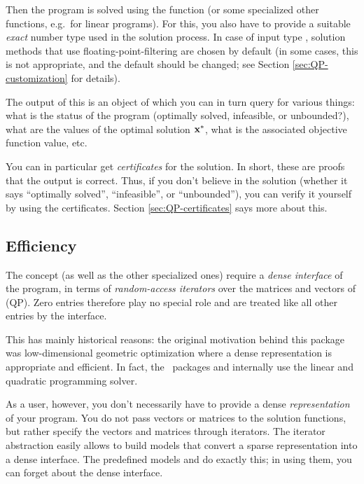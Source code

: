 Then the program is solved using the function 
(or some specialized other functions, e.g.\ for linear programs). For this,
you also have to provide a suitable \emph{exact} number type  used
in the solution process. In case of input type , solution 
methods that use floating-point-filtering are chosen by default (in some 
cases, this is not appropriate, and the default should be changed; 
see Section \ref{sec:QP-customization} for details).

The output of this is an object of 
which you can in turn query for various things: what is the status of 
the program (optimally solved, infeasible, or unbounded?), what are 
the values of the optimal solution $\mathbf{x}^*$, what is the associated
objective function value, etc. 

You can in particular get \emph{certificates} for the solution. In short,
these are proofs that the output is correct. Thus, if you don't believe 
in the solution (whether it says ``optimally solved'', ``infeasible'', 
or ``unbounded''), you can verify it yourself by using the certificates.
Section \ref{sec:QP-certificates} says more about this.

\subsection{Efficiency}
The concept  (as well as the
other specialized ones) require a \emph{dense interface} 
of the program, in terms of \emph{random-access iterators} over 
the matrices and vectors of (QP). Zero entries therefore play no
special role and are treated like all other entries by the
interface.  

This has mainly historical
reasons: the original motivation behind this package was 
low-dimensional geometric optimization where 
a dense representation is appropriate and efficient. In fact, 
the \cgal\ packages  and
 internally use the linear 
and quadratic programming solver. 

As a user, however, you don't necessarily have to provide a dense
\emph{representation} of your program. You do not pass vectors or
matrices to the solution functions, but rather specify the vectors 
and matrices through iterators. The iterator abstraction 
easily allows to build models that convert a sparse representation 
into a dense interface. The predefined models  
and  do exactly this; in using them, 
you can forget about the dense interface.  

